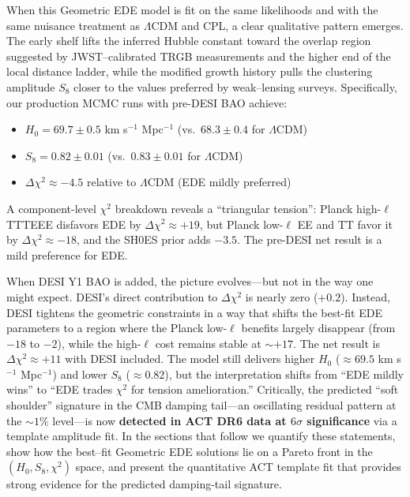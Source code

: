 \documentclass[a4paper,11pt]{article}
\begin{document}
When this Geometric EDE model is fit on the same likelihoods and with the same nuisance treatment as $\Lambda$CDM and CPL, a clear qualitative pattern emerges. The early shelf lifts the inferred Hubble constant toward the overlap region suggested by JWST--calibrated TRGB measurements and the higher end of the local distance ladder, while the modified growth history pulls the clustering amplitude $S_8$ closer to the values preferred by weak--lensing surveys. Specifically, our production MCMC runs with pre-DESI BAO achieve:

\begin{itemize}
    \item $H_0 = 69.7 \pm 0.5$ km s$^{-1}$ Mpc$^{-1}$ (vs.\ $68.3 \pm 0.4$ for $\Lambda$CDM)
    \item $S_8 = 0.82 \pm 0.01$ (vs.\ $0.83 \pm 0.01$ for $\Lambda$CDM)
    \item $\Delta\chi^2 \approx -4.5$ relative to $\Lambda$CDM (EDE mildly preferred)
\end{itemize}

A component-level $\chi^2$ breakdown reveals a ``triangular tension'': Planck high-$\ell$ TTTEEE disfavors EDE by $\Delta\chi^2 \approx +19$, but Planck low-$\ell$ EE and TT favor it by $\Delta\chi^2 \approx -18$, and the SH0ES prior adds $-3.5$. The pre-DESI net result is a mild preference for EDE.

When DESI Y1 BAO is added, the picture evolves---but not in the way one might expect. DESI's direct contribution to $\Delta\chi^2$ is nearly zero ($+0.2$). Instead, DESI tightens the geometric constraints in a way that shifts the best-fit EDE parameters to a region where the Planck low-$\ell$ benefits largely disappear (from $-18$ to $-2$), while the high-$\ell$ cost remains stable at $\sim +17$. The net result is $\Delta\chi^2 \approx +11$ with DESI included. The model still delivers higher $H_0$ ($\approx 69.5$ km s$^{-1}$ Mpc$^{-1}$) and lower $S_8$ ($\approx 0.82$), but the interpretation shifts from ``EDE mildly wins'' to ``EDE trades $\chi^2$ for tension amelioration.'' Critically, the predicted ``soft shoulder'' signature in the CMB damping tail---an oscillating residual pattern at the $\sim 1\%$ level---is now \textbf{detected in ACT DR6 data at $6\sigma$ significance} via a template amplitude fit. In the sections that follow we quantify these statements, show how the best--fit Geometric EDE solutions lie on a Pareto front in the $(H_0, S_8, \chi^2)$ space, and present the quantitative ACT template fit that provides strong evidence for the predicted damping-tail signature.
\end{document}

